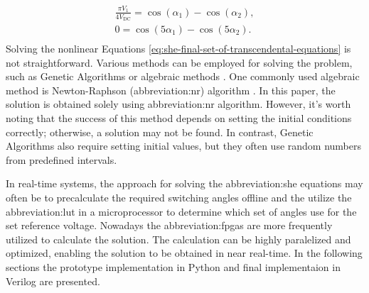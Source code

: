 \documentclass[a4paper, twoside, 11pt]{article}
\begin{document}
            \begin{equation}
                \begin{gathered}
                    \frac{\pi V_1}{4 V_{\mathrm{DC}}} = \cos(\alpha_1) - \cos(\alpha_2),\\
                    0 = \cos(5 \alpha_1) - \cos(5 \alpha_2).\\
                \end{gathered}
                \label{eq:she-final-set-of-transcendental-equations}
            \end{equation}
            Solving the nonlinear Equations \ref{eq:she-final-set-of-transcendental-equations} is not straightforward. Various methods can be employed for solving the problem, such as Genetic Algorithms \cite{taghizadeh-Harmonic-elimination-of-multilevel-inverters-using-particle-swarm-optimization, Ortiz-Espinoza-PWM-with-Selective-Harmonic-Elimination-Using-Optimization-Inspired-on-Earthquakes-for-AC-Electric-Drives, Abdelqawee_Naser-SELECTIVE-HARMONIC-ELIMINATION-PWM-VOLTAGE-SOURCE-INVERTER-BASED-ON-GENETIC-ALGORITHM} or algebraic methods \cite{wang-A-Comprehensive-Review-of-Solving-Selective-Harmonic-Elimination-Problem-with-Algebraic-Algorithms, Chiasson-A-Complete-Solution-to-the-Harmonic-Elimination-Problem}. One commonly used algebraic method is Newton-Raphson (\gls{abbreviation:nr}) algorithm \cite{Balow-A-Selective-Harmonic-Elimination-SHE-Technique-for-the-Multi-Leveled-Inverters}. In this paper, the solution is obtained solely using \gls{abbreviation:nr} algorithm. However, it's worth noting that the success of this method depends on setting the initial conditions correctly; otherwise, a solution may not be found. In contrast, Genetic Algorithms also require setting initial values, but they often use random numbers from predefined intervals.\par
            In real-time systems, the approach for solving the \gls{abbreviation:she} equations may often be to precalculate the required switching angles offline and the utilize the \gls{abbreviation:lut} in a microprocessor to determine which set of angles use for the set reference voltage. Nowadays the \gls{abbreviation:fpga}s are more frequently utilized to calculate the solution. The calculation can be highly paralelized and optimized, enabling the solution to be obtained in near real-time. In the following sections the prototype implementation in Python and final implementaion in Verilog are presented.
\end{document}
